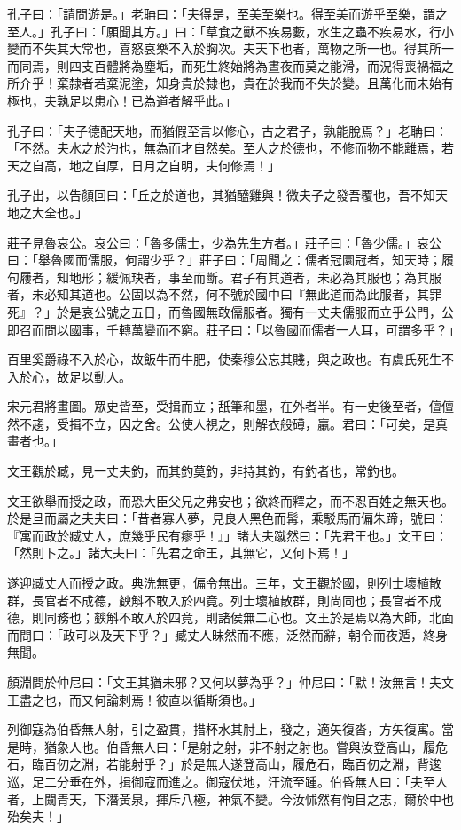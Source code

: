 \begin{pinyinscope}
孔子曰：「請問遊是。」老聃曰：「夫得是，至美至樂也。得至美而遊乎至樂，謂之至人。」孔子曰：「願聞其方。」曰：「草食之獸不疾易藪，水生之蟲不疾易水，行小變而不失其大常也，喜怒哀樂不入於胸次。夫天下也者，萬物之所一也。得其所一而同焉，則四支百體將為塵垢，而死生終始將為晝夜而莫之能滑，而況得喪禍福之所介乎！棄隸者若棄泥塗，知身貴於隸也，貴在於我而不失於變。且萬化而未始有極也，夫孰足以患心！已為道者解乎此。」

孔子曰：「夫子德配天地，而猶假至言以修心，古之君子，孰能脫焉？」老聃曰：「不然。夫水之於汋也，無為而才自然矣。至人之於德也，不修而物不能離焉，若天之自高，地之自厚，日月之自明，夫何修焉！」

孔子出，以告顏回曰：「丘之於道也，其猶醯雞與！微夫子之發吾覆也，吾不知天地之大全也。」

莊子見魯哀公。哀公曰：「魯多儒士，少為先生方者。」莊子曰：「魯少儒。」哀公曰：「舉魯國而儒服，何謂少乎？」莊子曰：「周聞之：儒者冠圜冠者，知天時；履句屨者，知地形；緩佩玦者，事至而斷。君子有其道者，未必為其服也；為其服者，未必知其道也。公固以為不然，何不號於國中曰『無此道而為此服者，其罪死』？」於是哀公號之五日，而魯國無敢儒服者。獨有一丈夫儒服而立乎公門，公即召而問以國事，千轉萬變而不窮。莊子曰：「以魯國而儒者一人耳，可謂多乎？」

百里奚爵祿不入於心，故飯牛而牛肥，使秦穆公忘其賤，與之政也。有虞氏死生不入於心，故足以動人。

宋元君將畫圖。眾史皆至，受揖而立；舐筆和墨，在外者半。有一史後至者，儃儃然不趨，受揖不立，因之舍。公使人視之，則解衣般礡，臝。君曰：「可矣，是真畫者也。」

文王觀於臧，見一丈夫釣，而其釣莫釣，非持其釣，有釣者也，常釣也。

文王欲舉而授之政，而恐大臣父兄之弗安也；欲終而釋之，而不忍百姓之無天也。於是旦而屬之夫夫曰：「昔者寡人夢，見良人黑色而髯，乘駁馬而偏朱蹄，號曰：『寓而政於臧丈人，庶幾乎民有瘳乎！』」諸大夫蹴然曰：「先君王也。」文王曰：「然則卜之。」諸大夫曰：「先君之命王，其無它，又何卜焉！」

遂迎臧丈人而授之政。典洗無更，偏令無出。三年，文王觀於國，則列士壞植散群，長官者不成德，斔斛不敢入於四竟。列士壞植散群，則尚同也；長官者不成德，則同務也；斔斛不敢入於四竟，則諸侯無二心也。文王於是焉以為大師，北面而問曰：「政可以及天下乎？」臧丈人昧然而不應，泛然而辭，朝令而夜遁，終身無聞。

顏淵問於仲尼曰：「文王其猶未邪？又何以夢為乎？」仲尼曰：「默！汝無言！夫文王盡之也，而又何論刺焉！彼直以循斯須也。」

列御寇為伯昏無人射，引之盈貫，措杯水其肘上，發之，適矢復沓，方矢復寓。當是時，猶象人也。伯昏無人曰：「是射之射，非不射之射也。嘗與汝登高山，履危石，臨百仞之淵，若能射乎？」於是無人遂登高山，履危石，臨百仞之淵，背逡巡，足二分垂在外，揖御寇而進之。御寇伏地，汗流至踵。伯昏無人曰：「夫至人者，上闚青天，下潛黃泉，揮斥八極，神氣不變。今汝怵然有恂目之志，爾於中也殆矣夫！」


\end{pinyinscope}
